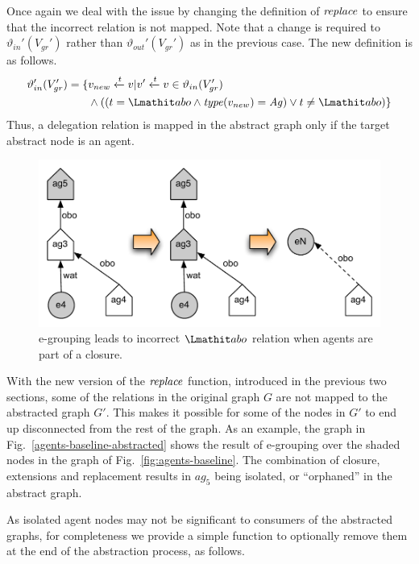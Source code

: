 Once again we deal with the issue by changing the definition of $\mathit{replace}$ to ensure that the incorrect relation is not mapped. 
%
Note that a change is required to $\vartheta_{in}'(V_{gr}')$ rather than $\vartheta_{out}'(V_{gr}')$ as in the previous case. The new definition is as follows.
\begin{align*}
\vartheta_{in}'(V_{gr}') = \{ & v_{new} \xleftarrow{t}  v |  v' \xleftarrow{t} v \in \vartheta_{in}(V_{gr}') \\
    & \wedge ( (t = \delegate \wedge \type(v_{new}) = \ag) \vee t \neq \delegate )\} 
\end{align*}
Thus, a delegation relation is mapped in the abstract graph only if the target abstract node is an agent.

\begin{figure}
\centering
\includegraphics[scale=.5]{figures/agents-baseline-obo-problem}
\caption{e-grouping leads to incorrect $\delegate$ relation when agents are part of a closure.}
\label{agents-baseline-obo-problem}
\end{figure}

With the new version of the $\mathit{replace}$ function, introduced in the previous two sections, some of the relations in the original graph $G$ are not mapped to the abstracted graph $G'$. This makes it possible for some of the nodes in $G'$ to end up disconnected from the rest of the graph. 
%
As an example, the graph in Fig.~\ref{agents-baseline-abstracted} shows the result of e-grouping over the shaded nodes in the graph of Fig.~\ref{fig:agents-baseline}. The combination of closure, extensions and replacement results in $ag_5$ being isolated, or ``orphaned'' in the abstract graph. 

%
As isolated agent nodes may not be significant to consumers of the abstracted graphs, for completeness we provide a simple function to optionally remove them at the end of the abstraction process, as follows.


